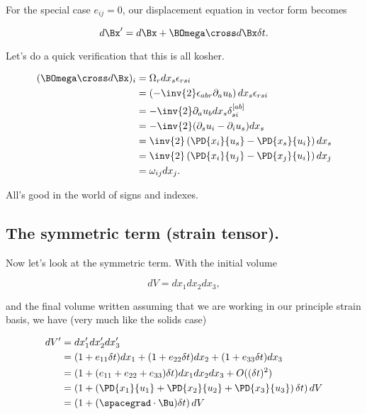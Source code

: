 For the special case $e_{ij} = 0$, our displacement equation in vector form becomes

\begin{equation}\label{eqn:continuumL9:150}
d\Bx' = d\Bx + \BOmega \cross d\Bx \delta t.
\end{equation}

Let's do a quick verification that this is all kosher.

\begin{align*}
(\BOmega \cross d\Bx)_i
&=
\Omega_r dx_s \epsilon_{rsi} \\
&=
\left(-\inv{2} \epsilon_{abr} \partial_a u_b \right) dx_s \epsilon_{rsi} \\
&=
-\inv{2} \partial_a u_b dx_s \delta^{[ab]}_{si} \\
&=
-\inv{2} (
\partial_s u_i
-\partial_i u_s
) dx_s  \\
&=
\inv{2} \left(
\PD{x_i}{u_s}
-\PD{x_s}{u_i}
\right) dx_s  \\
&=
\inv{2} \left(
\PD{x_i}{u_j}
-\PD{x_j}{u_i}
\right) dx_j  \\
&=
\omega_{ij} dx_j.
\end{align*}

All's good in the world of signs and indexes.

\subsection{The symmetric term (strain tensor).}

Now let's look at the symmetric term.  With the initial volume

\begin{equation}\label{eqn:continuumL9:170}
dV = dx_1 dx_2 dx_3,
\end{equation}

and the final volume written assuming that we are working in our principle strain basis, we have (very much like the solids case)

\begin{align*}
dV' 
&= dx_1' dx_2' dx_3' \\
&= 
(1 + e_{11} \delta t) dx_1
+(1 + e_{22} \delta t) dx_2
+(1 + e_{33} \delta t) dx_3
\\
&=
(1 + (e_{11} + e_{22} + e_{33}) \delta t) dx_1 dx_2 dx_3 + O((\delta t)^2) \\
&=
\left(1 + 
\left(
\PD{x_1}{u_1}
+\PD{x_2}{u_2}
+\PD{x_3}{u_3}
\right)
\delta t \right) dV \\
&=
\left(
1 + (\spacegrad \cdot \Bu) 
\delta t
\right) dV \\
\end{align*}

